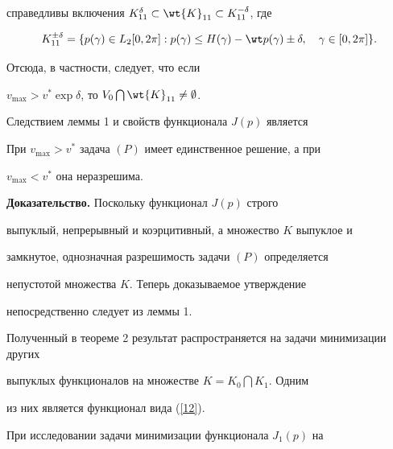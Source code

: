 \begin{note}
справедливы включения $K_{11}^{\delta}\subset


\wt{K}_{11}\subset K_{11}^{-\delta}$, где


$$


K_{11}^{\pm\delta}= \{p(\gamma)\in L_{2}[0,2\pi]: p(\gamma) \leq


H(\gamma)-\wt p(\gamma)\pm\delta,\quad \gamma \in [0,2\pi] \}.


$$


Отсюда, в частности, следует, что если


$v_{\max}>v^{*}\exp \delta$, то $V_0\bigcap


\wt{K}_{11}\neq\emptyset$.


\end{note}





Следствием леммы 1 и свойств функционала $J(p)$ является





\begin{thm}


При $v_{\max}>v^{*}$ задача $(P)$ имеет единственное решение, а при


$v_{\max}<v^{*}$ она неразрешима.


\end{thm}





{\bf Доказательство.} Поскольку функционал $J(p)$ строго


выпуклый, непрерывный и коэрцитивный, а множество $K$ выпуклое и


замкнутое, однозначная разрешимость задачи $(P)$ определяется


непустотой множества $K$. Теперь доказываемое утверждение


непосредственно следует из леммы 1.


\medskip





Полученный в теореме 2 результат распространяется на задачи минимизации других


выпуклых функционалов на множестве $K=K_{0}\bigcap K_{1}$. Одним


из них является функционал вида (\ref{12}).





При исследовании задачи минимизации функционала $J_{1}(p)$ на


